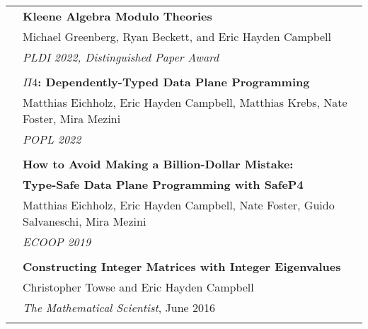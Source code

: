 \documentclass[letterpaper,10pt,oneside]{article}
\begin{document}
\begin{tabular}{@{} l l}
  & \textbf{Kleene Algebra Modulo Theories} \\
  & Michael Greenberg, Ryan Beckett, and Eric Hayden Campbell \\
  & \textit{PLDI 2022, Distinguished Paper Award} \\
  &\\

  & \textbf{$\Pi4$: Dependently-Typed Data Plane Programming} \\
  & Matthias Eichholz, Eric Hayden Campbell, Matthias Krebs, Nate Foster, Mira Mezini \\
  & \textit{POPL 2022}\\ & \\

  & \textbf{How to Avoid Making a Billion-Dollar Mistake:}\\
  & \textbf{Type-Safe Data Plane Programming with SafeP4} \\
  & Matthias Eichholz, Eric Hayden Campbell, Nate Foster, Guido Salvaneschi, Mira Mezini \\
  & \textit{ECOOP 2019} \\
  & \\


  & \textbf{Constructing Integer Matrices with Integer Eigenvalues} \\
  & Christopher Towse and Eric Hayden Campbell \\
  & \textit{The Mathematical Scientist}, June 2016 \\
  & \\

\end{tabular}
\end{document}
